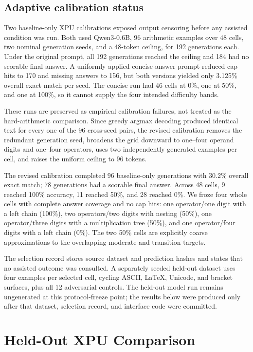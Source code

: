 \documentclass[11pt]{article}
\begin{document}
\subsection{Adaptive calibration status}

Two baseline-only XPU calibrations exposed output censoring before any assisted
condition was run. Both used Qwen3-0.6B, 96 arithmetic examples over 48 cells,
two nominal generation seeds, and a 48-token ceiling, for 192 generations each.
Under the original prompt, all 192 generations reached the ceiling and 184 had
no scorable final answer. A uniformly applied concise-answer prompt reduced cap
hits to 170 and missing answers to 156, but both versions yielded only 3.125\%
overall exact match per seed. The concise run had 46 cells at 0\%, one at 50\%,
and one at 100\%, so it cannot supply the four intended difficulty bands.

These runs are preserved as empirical calibration failures, not treated as the
hard-arithmetic comparison. Since greedy argmax decoding produced identical text
for every one of the 96 cross-seed pairs, the revised calibration removes the
redundant generation seed, broadens the grid downward to one--four operand digits
and one--four operators, uses two independently generated examples per cell, and
raises the uniform ceiling to 96 tokens.

The revised calibration completed 96 baseline-only generations with 30.2\%
overall exact match; 78 generations had a scorable final answer. Across 48 cells,
9 reached 100\% accuracy, 11 reached 50\%, and 28 reached 0\%. We froze four
whole cells with complete answer coverage and no cap hits: one operator/one digit
with a left chain (100\%), two operators/two digits with nesting (50\%), one
operator/three digits with a multiplication tree (50\%), and one operator/four
digits with a left chain (0\%). The two 50\% cells are explicitly coarse
approximations to the overlapping moderate and transition targets.

The selection record stores source dataset and prediction hashes and states that
no assisted outcome was consulted. A separately seeded held-out dataset uses four
examples per selected cell, cycling ASCII, LaTeX, Unicode, and bracket surfaces,
plus all 12 adversarial controls. The held-out model run remains ungenerated at
this protocol-freeze point; the results below were produced only after that
dataset, selection record, and interface code were committed.

\section{Held-Out XPU Comparison}
\end{document}
